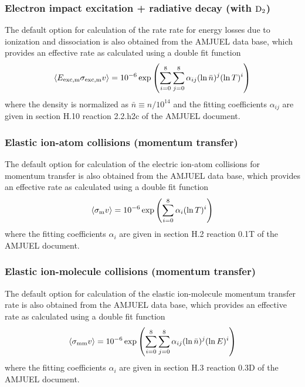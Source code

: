 \documentclass[amsmath,amssymb,a4]{revtex4-2}
\begin{document}
\subsubsection*{Electron impact excitation + radiative decay (with ${\rm D_2}$)}
The default option for calculation of the rate rate for energy losses due to ionization and dissociation is also obtained from the AMJUEL data base, which provides an effective rate as calculated using a double fit function
\begin{equation}\label{Electron impact excitation + radiative decay molecule}
    \langle E_{\rm exc,m}\sigma_{\rm exc,m} v\rangle = 10^{-6} \exp\left( \sum_{i=0}^8\sum_{j=0}^8 \alpha_{ij} (\ln \bar n)^j (\ln T)^i \right)  %
\end{equation}
where the density is normalized as $\bar n \equiv n / 10^{14}$ and the fitting coefficients $\alpha_{ij}$ are given in section {H.10} reaction {2.2.h2c} of the AMJUEL document.


\subsubsection*{Elastic ion-atom collisions (momentum transfer)}
The default option for calculation of the electric ion-atom collisions for momentum transfer is also obtained from the AMJUEL data base, which provides an effective rate as calculated using a double fit function
\begin{equation}\label{Elastic ion-atom collisions}
    \langle \sigma_{\rm m} v\rangle = 10^{-6} \exp\left( \sum_{i=0}^8 \alpha_{i} (\ln T)^i \right)  %
\end{equation}
where the fitting coefficients $\alpha_{i}$ are given in section {H.2} reaction {0.1T} of the AMJUEL document.

\subsubsection*{Elastic ion-molecule collisions (momentum transfer)}
The default option for calculation of the elastic ion-molecule momentum transfer rate is also obtained from the AMJUEL data base, which provides an effective rate as calculated using a double fit function
\begin{equation}\label{ionization_AMJUEL}
    \langle\sigma_{\rm mm} v\rangle = 10^{-6} \exp\left( \sum_{i=0}^8\sum_{j=0}^8 \alpha_{ij}  (\ln \bar n)^j (\ln E)^i \right)  %
\end{equation}
where the fitting coefficients $\alpha_{i}$ are given in section {H.3} reaction {0.3D} of the AMJUEL document.
\end{document}
